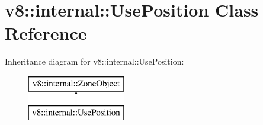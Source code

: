 \hypertarget{classv8_1_1internal_1_1_use_position}{}\section{v8\+:\+:internal\+:\+:Use\+Position Class Reference}
\label{classv8_1_1internal_1_1_use_position}
Inheritance diagram for v8\+:\+:internal\+:\+:Use\+Position\+:\begin{figure}[H]
\begin{center}
\leavevmode
\includegraphics[height=2.000000cm]{classv8_1_1internal_1_1_use_position}
\end{center}
\end{figure}

